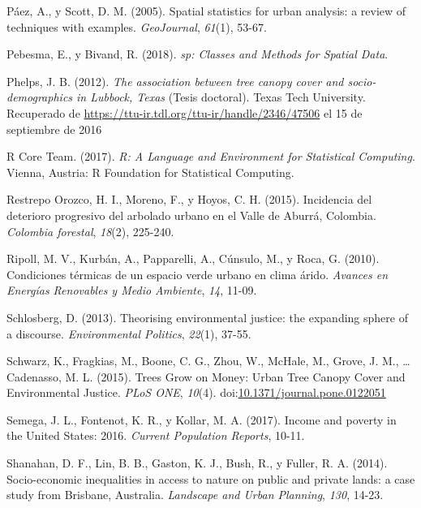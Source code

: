 \documentclass[12pt,a4paper,oneside, openany]{book}
\theoremstyle{definition}
\theoremstyle{definition}
\theoremstyle{definition}
\theoremstyle{remark}
\begin{document}
\hypertarget{ref-paez_spatial_2005}{}
Páez, A., y Scott, D. M. (2005). Spatial statistics for urban analysis:
a review of techniques with examples. \emph{GeoJournal}, \emph{61}(1),
53-67.

\hypertarget{ref-R-sp}{}
Pebesma, E., y Bivand, R. (2018). \emph{sp: Classes and Methods for
Spatial Data}.

\hypertarget{ref-phelps_association_2012}{}
Phelps, J. B. (2012). \emph{The association between tree canopy cover
and socio-demographics in Lubbock, Texas} (Tesis doctoral). Texas Tech
University. Recuperado de
\url{https://ttu-ir.tdl.org/ttu-ir/handle/2346/47506} el 15 de
septiembre de 2016

\hypertarget{ref-R-base}{}
R Core Team. (2017). \emph{R: A Language and Environment for Statistical
Computing}. Vienna, Austria: R Foundation for Statistical Computing.

\hypertarget{ref-restrepo_incidence_2015}{}
Restrepo Orozco, H. I., Moreno, F., y Hoyos, C. H. (2015). Incidencia
del deterioro progresivo del arbolado urbano en el Valle de Aburrá,
Colombia. \emph{Colombia forestal}, \emph{18}(2), 225-240.

\hypertarget{ref-ripoll_condiciones_2010}{}
Ripoll, M. V., Kurbán, A., Papparelli, A., Cúnsulo, M., y Roca, G.
(2010). Condiciones térmicas de un espacio verde urbano en clima árido.
\emph{Avances en Energías Renovables y Medio Ambiente}, \emph{14},
11-09.

\hypertarget{ref-schlosberg_theorising_2013}{}
Schlosberg, D. (2013). Theorising environmental justice: the expanding
sphere of a discourse. \emph{Environmental Politics}, \emph{22}(1),
37-55.

\hypertarget{ref-schwarz_trees_2015}{}
Schwarz, K., Fragkias, M., Boone, C. G., Zhou, W., McHale, M., Grove, J.
M., \ldots{} Cadenasso, M. L. (2015). Trees Grow on Money: Urban Tree
Canopy Cover and Environmental Justice. \emph{PLoS ONE}, \emph{10}(4).
doi:\href{https://doi.org/10.1371/journal.pone.0122051}{10.1371/journal.pone.0122051}

\hypertarget{ref-semega2017income}{}
Semega, J. L., Fontenot, K. R., y Kollar, M. A. (2017). Income and
poverty in the United States: 2016. \emph{Current Population Reports},
10-11.

\hypertarget{ref-shanahan_socio-economic_2014}{}
Shanahan, D. F., Lin, B. B., Gaston, K. J., Bush, R., y Fuller, R. A.
(2014). Socio-economic inequalities in access to nature on public and
private lands: a case study from Brisbane, Australia. \emph{Landscape
and Urban Planning}, \emph{130}, 14-23.
\end{document}
